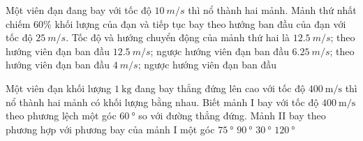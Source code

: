 \begin{ex}
Một viên đạn đang bay với tốc độ $\SI{10}{m/s}$ thì nổ thành hai mảnh. Mảnh thứ nhất chiếm $60\%$ khối lượng của  đạn và tiếp tục bay theo hướng ban đầu của đạn với tốc độ $\SI{25}{m/s}$. Tốc độ và hướng chuyển động của mảnh thứ hai là 	
	\choice
	{$\SI{12,5}{m/s}$; theo hướng viên đạn ban đầu}
	{\True $\SI{12,5}{m/s}$; ngược hướng viên đạn ban đầu}
	{$\SI{6,25}{m/s}$; theo hướng viên đạn ban đầu}
	{$\SI{4}{m/s}$; ngược hướng viên đạn ban đầu}
\end{ex}
\begin{ex}
	Một viên đạn khối lượng $\SI{1}{\kilogram}$ đang bay thẳng đứng lên cao với tốc độ $\SI{400}{\meter/\second}$ thì nổ thành hai mảnh có khối lượng bằng nhau. Biết mảnh I bay với tốc độ $\SI{400}{\meter/\second}$ theo phương lệch một góc $\SI{60}{\degree}$ so với đường thẳng đứng. Mảnh II bay theo phương hợp với phương bay của mảnh I một góc
	\choice
	{$\SI{75}{\degree}$}
	{\True $\SI{90}{\degree}$}
	{$\SI{30}{\degree}$}
	{$\SI{120}{\degree}$}
\end{ex}
